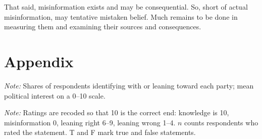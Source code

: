 \documentclass[11pt]{article}
\begin{document}
That said, misinformation exists and may be consequential. So, short of actual misinformation, may tentative mistaken belief. Much remains to be done in measuring them and examining their sources and consequences.




\clearpage
\appendix
\section*{Appendix}
\setcounter{table}{0}
\renewcommand{\thetable}{A\arabic{table}}

\begin{table}[H]
\centering
\caption{Balance across randomly assigned arms}
\label{tab:balance}
\small

\begin{minipage}{0.8\linewidth}
\vspace{0.5em}\footnotesize \emph{Note:} Shares of respondents identifying with or leaning toward each party; mean political interest on a 0--10 scale.
\end{minipage}
\end{table}

\begin{table}[H]
\centering
\caption{Belief states on the 0--10 scale (strict scoring), percent of ratings}
\label{tab:states}
\footnotesize
\setlength{\tabcolsep}{2pt}

\begin{minipage}{0.95\linewidth}
\vspace{0.5em}\footnotesize \emph{Note:} Ratings are recoded so that 10 is the correct end: knowledge is 10, misinformation 0, leaning right 6--9, leaning wrong 1--4. $n$ counts respondents who rated the statement. T and F mark true and false statements.
\end{minipage}
\end{table}

{\footnotesize
\setlength{\tabcolsep}{3pt}

}
\end{document}
